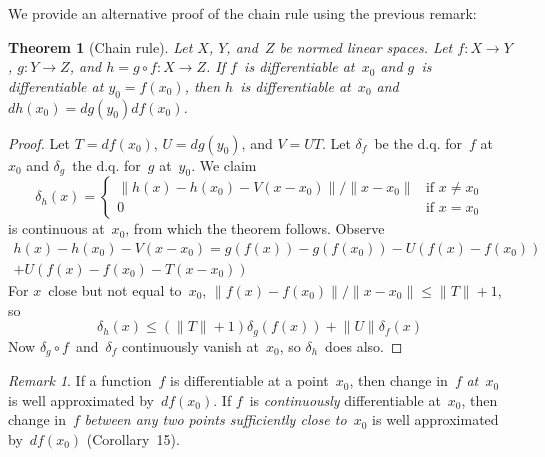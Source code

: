 \documentclass[letterpaper,12pt]{article}
\newcommand{\after}{\circ}
\newcommand{\df}{d\!f}
\newcommand{\dg}{dg}
\renewcommand{\dh}{d\!h}
\newcommand{\norm}[1]{\lVert{#1}\rVert}
\theoremstyle{plain}
\newtheorem*{thm}{Theorem}
\theoremstyle{definition}
\theoremstyle{remark}
\newtheorem*{rmk}{Remark}
\begin{document}
\noindent We provide an alternative proof of the chain rule using the previous remark:
\begin{thm}[Chain rule]
Let \(X\), \(Y\), and~\(Z\) be normed linear spaces. Let \(f:X\to Y\), \(g:Y\to Z\), and \(h=g\after f:X\to Z\). If \(f\)~is differentiable at~\(x_0\) and \(g\)~is differentiable at \(y_0=f(x_0)\), then \(h\)~is differentiable at~\(x_0\) and \(\dh(x_0)=\dg(y_0)\df(x_0)\).
\end{thm}
\begin{proof}
Let \(T=\df(x_0)\), \(U=\dg(y_0)\), and \(V=UT\). Let \(\delta_f\)~be the d.q. for~\(f\) at~\(x_0\) and \(\delta_g\)~the d.q. for~\(g\) at~\(y_0\). We claim
\[\delta_h(x)=\begin{cases}
\norm{h(x)-h(x_0)-V(x-x_0)}/\norm{x-x_0}&\text{if }x\ne x_0\\
0&\text{if }x=x_0
\end{cases}\]
is continuous at~\(x_0\), from which the theorem follows. Observe
\begin{multline*}
h(x)-h(x_0)-V(x-x_0)=g(f(x))-g(f(x_0))-U(f(x)-f(x_0))\\
	+U(f(x)-f(x_0)-T(x-x_0))
\end{multline*}
For \(x\)~close but not equal to~\(x_0\), \(\norm{f(x)-f(x_0)}/\norm{x-x_0}\le\norm{T}+1\), so
\[\delta_h(x)\le(\norm{T}+1)\delta_g(f(x))+\norm{U}\delta_f(x)\]
Now \(\delta_g\after f\)~and~\(\delta_f\) continuously vanish at~\(x_0\), so \(\delta_h\)~does also.
\end{proof}

\begin{rmk}
If a function~\(f\) is differentiable at a point~\(x_0\), then change in~\(f\) \emph{at~\(x_0\)} is well approximated by~\(\df(x_0)\). If \(f\)~is \emph{continuously} differentiable at~\(x_0\), then change in~\(f\) \emph{between any two points sufficiently close to~\(x_0\)} is well approximated by~\(\df(x_0)\) (Corollary~15).
\end{rmk}
\end{document}
